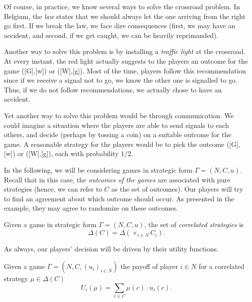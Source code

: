 \begin{example}
Of course, in practice, we know several ways to solve the crossroad problem. In Belgium, the \emph{law} states that we should always let the one arriving from the right go first. If we break the law, we face dire consequences (first, we may have an accident, and second, if we get caught, we can be heavily reprimanded).

Another way to solve this problem is by installing a \emph{traffic light} at the crossroad. At every instant, the red light actually suggests to the players an outcome for the game ([G],[w]) or ([W],[g]). Most of the time, players follow this recommendation since if we receive a signal not to go, we know the other one is signalled to go. Thus, if we do not follow recommendations, we actually chose to have an accident.

Yet another way to solve this problem would be through communication. We could imagine a situation where the players are able to send signals to each others, and decide (perhaps by tossing a coin) on a suitable outcome for the game. A reasonable strategy for the players would be to pick the outcome ([G],[w]) or ([W],[g]), each with probability $1/2$.

\label{ch5:example:crossroads1}
\end{example}

In the following, we will be considering games in strategic form $\Gamma = (N,C,u)$.
Recall that in this case, the \emph{outcomes of the games} are associated with pure strategies (hence, we can refer to $C$ as the set of outcomes).
Our players will try to find an agreement about which outcome should occur. As presented in the example, they may agree to randomize on these outcomes.

\begin{definition}
Given a game in strategic form $\Gamma = (N,C,u)$, the set of \emph{correlated strategies} is
$$ \Delta(C) = \Delta(\times_{i \in N} C_i). $$
\end{definition}

As always, our players' decision will be driven by their utility functions.
\begin{definition}
Given a game $\Gamma = (N, C, (u_i)_{i \in N})$  the payoff of player $i \in N$ for a correlated strategy $\mu \in \Delta(C)$
$$U_i(\mu) = \sum_{c \in C} \mu(c) \cdot u_i(c).$$
\end{definition}

